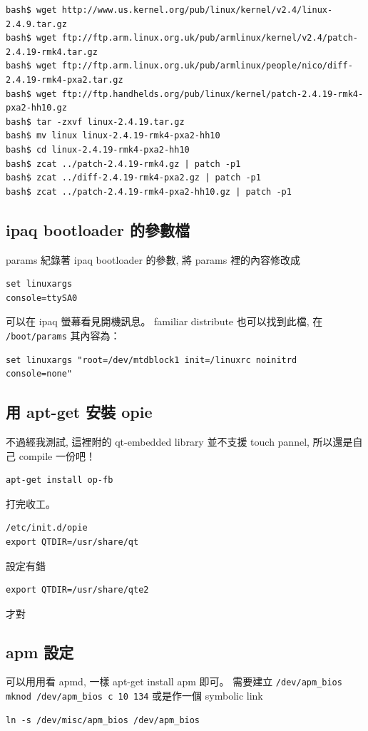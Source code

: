 \documentclass[12pt,a4paper]{article}
\begin{document}
\begin{CJK}{UTF8}{cwmu}
\begin{verbatim}
bash$ wget http://www.us.kernel.org/pub/linux/kernel/v2.4/linux-2.4.9.tar.gz
bash$ wget ftp://ftp.arm.linux.org.uk/pub/armlinux/kernel/v2.4/patch-2.4.19-rmk4.tar.gz
bash$ wget ftp://ftp.arm.linux.org.uk/pub/armlinux/people/nico/diff-2.4.19-rmk4-pxa2.tar.gz
bash$ wget ftp://ftp.handhelds.org/pub/linux/kernel/patch-2.4.19-rmk4-pxa2-hh10.gz
bash$ tar -zxvf linux-2.4.19.tar.gz
bash$ mv linux linux-2.4.19-rmk4-pxa2-hh10
bash$ cd linux-2.4.19-rmk4-pxa2-hh10
bash$ zcat ../patch-2.4.19-rmk4.gz | patch -p1
bash$ zcat ../diff-2.4.19-rmk4-pxa2.gz | patch -p1
bash$ zcat ../patch-2.4.19-rmk4-pxa2-hh10.gz | patch -p1
\end{verbatim}


\subsection{ipaq bootloader 的參數檔}
params 紀錄著 ipaq bootloader 的參數,
將 params 裡的內容修改成

\begin{verbatim}
set linuxargs
console=ttySA0
\end{verbatim}

可以在 ipaq 螢幕看見開機訊息。
familiar distribute 也可以找到此檔, 在 \verb+/boot/params+
其內容為：
\begin{verbatim}
set linuxargs "root=/dev/mtdblock1 init=/linuxrc noinitrd console=none"
\end{verbatim}

\subsection{用 apt-get 安裝 opie}
不過經我測試, 這裡附的 qt-embedded library 並不支援 touch pannel,
所以還是自己 compile 一份吧！
\begin{verbatim}
apt-get install op-fb
\end{verbatim}
打完收工。
\begin{verbatim}
/etc/init.d/opie
export QTDIR=/usr/share/qt
\end{verbatim}
設定有錯
\begin{verbatim}
export QTDIR=/usr/share/qte2
\end{verbatim}
才對

\subsection{apm 設定}
可以用用看 apmd, 一樣 apt-get install apm 即可。
需要建立 \verb+/dev/apm_bios+
\verb+mknod /dev/apm_bios c 10 134+
或是作一個 symbolic link
\begin{verbatim}
ln -s /dev/misc/apm_bios /dev/apm_bios
\end{verbatim}


\end{CJK}
\end{document}
